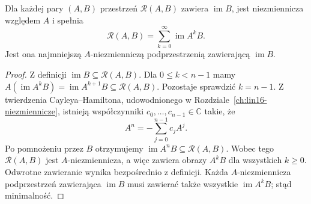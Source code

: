 \begin{lemat}
\label{lem:lin25-invariant}
Dla każdej pary \((A,B)\)
przestrzeń \(\mathcal R(A,B)\)
zawiera \(\operatorname{im}B\),
jest niezmiennicza względem \(A\)
i spełnia
\[
 \mathcal R(A,B)
 =\sum_{k=0}^{\infty}\operatorname{im}A^kB.
\]
Jest ona najmniejszą
\(A\)-niezmienniczą podprzestrzenią
zawierającą \(\operatorname{im}B\).
\end{lemat}
\begin{proof}
Z definicji
\(\operatorname{im}B\subseteq\mathcal R(A,B)\).
Dla \(0\le k<n-1\)
mamy
\(A(\operatorname{im}A^kB)
 =\operatorname{im}A^{k+1}B
 \subseteq\mathcal R(A,B)\).
Pozostaje sprawdzić \(k=n-1\).
Z twierdzenia Cayleya--Hamiltona,
udowodnionego w
Rozdziale~\ref{ch:lin16-niezmiennicze},
istnieją współczynniki
\(c_0,\ldots,c_{n-1}\in\mathbb C\)
takie, że
\[
 A^n=-\sum_{j=0}^{n-1}c_jA^j.
\]
Po pomnożeniu przez \(B\)
otrzymujemy
\(\operatorname{im}A^nB
 \subseteq\mathcal R(A,B)\).
Wobec tego \(\mathcal R(A,B)\)
jest \(A\)-niezmiennicza,
a więc zawiera obrazy
\(A^kB\) dla wszystkich \(k\ge0\).
Odwrotne zawieranie
wynika bezpośrednio z definicji.
Każda \(A\)-niezmiennicza
podprzestrzeń zawierająca
\(\operatorname{im}B\)
musi zawierać także wszystkie
\(\operatorname{im}A^kB\);
stąd minimalność.
\end{proof}

